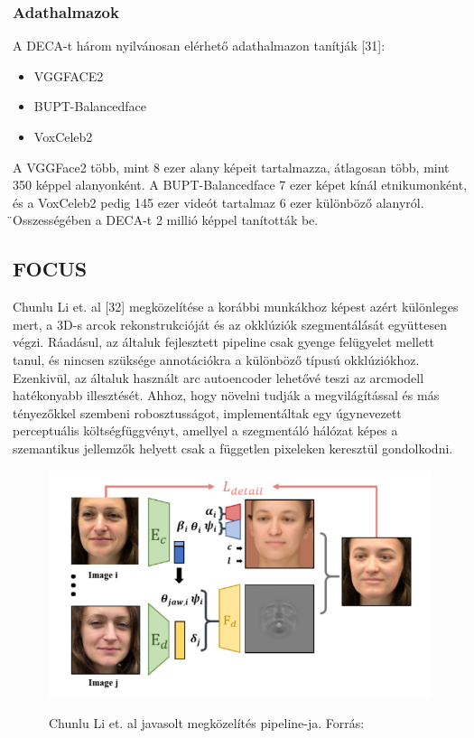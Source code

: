 \documentclass[12pt,a4]{article}
\begin{document}
 	\subsubsection{Adathalmazok}
 	
 	A DECA-t három nyilvánosan elérhető adathalmazon tanítják [31]:
 	\begin{itemize}
 		\item VGGFACE2
 		\item BUPT-Balancedface
 		\item VoxCeleb2
 	\end{itemize}
 
 	A VGGFace2 több, mint 8 ezer alany képeit tartalmazza, átlagosan több,
 	mint 350 képpel alanyonként. A BUPT-Balancedface 7 ezer képet kínál
 	etnikumonként, és a VoxCeleb2 pedig 145 ezer videót tartalmaz 6 ezer
 	különböző alanyról.  ̈Osszességében a DECA-t 2 millió képpel tanították
 	be.
 	
 	\subsection{FOCUS}
 	
 	Chunlu Li et. al [32] megközelítése a korábbi munkákhoz képest azért
 	különleges mert, a 3D-s arcok rekonstrukcióját és az okklúziók szegmentálását
 	együttesen végzi. Ráadásul, az általuk fejlesztett pipeline csak gyenge felügyelet mellett tanul, és nincsen szüksége annotációkra a különböző típusú
 	okklúziókhoz.
 	Ezenkivül, az általuk használt arc autoencoder lehetővé teszi az arcmodell hatékonyabb illesztését. Ahhoz, hogy növelni tudják a megvilágítással és
 	más tényezőkkel szembeni robosztusságot, implementáltak egy úgynevezett
 	perceptuális költségfüggvényt, amellyel a szegmentáló hálózat képes a szemantikus jellemzők helyett csak a független pixeleken keresztül gondolkodni.
 	
 	\begin{figure}[h]	
 		\centering
 		\includegraphics[width=1\linewidth]{ldetail}
 		\label{fig:ldetail}
 		\caption{Chunlu Li et. al javasolt megközelítés pipeline-ja.
 			Forrás:\cite{focus}}
 	\end{figure}
 	
\end{document}
